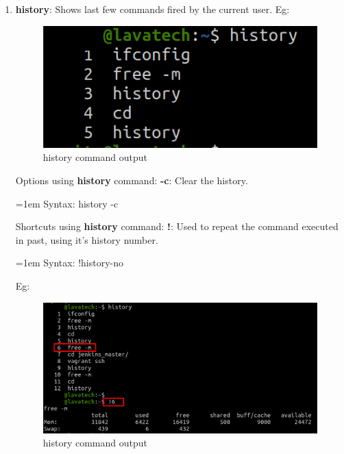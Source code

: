 \begin{flushleft}
\begin{enumerate}
				
		\item \textbf{history}: Shows last few commands fired by the current user.
		\newline
		Eg:
		\begin{figure}[h!]
			\centering
			\includegraphics[scale=.4]{content/chapter2/images/history.png}
			\caption{history command output}
			\label{fig:h6}
		\end{figure}
	\newline
		Options using \textbf{history} command:
		\newline
		\textbf{-c}: Clear the history.
			\begin{tcolorbox}[breakable,notitle,boxrule=1pt,colback=pink,colframe=pink]
				\color{black}
				\font=1em
				Syntax:  history -c
				\font=4pt
			\end{tcolorbox}
		Shortcuts using \textbf{history} command:
		\newline
		\textbf{!}: Used to repeat the command executed in past, using it's history number.
		\begin{tcolorbox}[breakable,notitle,boxrule=1pt,colback=pink,colframe=pink]
			\color{black}
			\font=1em
			Syntax:  !history-no
			\font=4pt
		\end{tcolorbox}
		Eg:
		\begin{figure}[h!]
			\centering
			\includegraphics[scale=.2]{content/chapter2/images/history2.png}
			\caption{history command output}
			\label{fig:h88}
		\end{figure}


\end{enumerate}
\end{flushleft}
